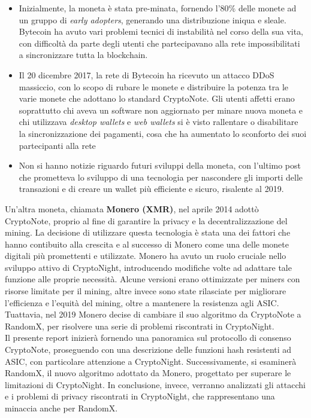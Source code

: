 \begin{itemize}
  \item Inizialmente, la moneta è stata pre-minata,
  fornendo l'80\% delle monete ad un gruppo di \emph{early adopters},
  generando una distribuzione iniqua e sleale. Bytecoin ha avuto vari
  problemi tecnici di instabilità nel corso della sua vita, con difficoltà
  da parte degli utenti che partecipavano alla rete impossibilitati a
  sincronizzare tutta la blockchain.

  \item Il 20 dicembre 2017, la rete di
  Bytecoin ha ricevuto un attacco DDoS massiccio, con lo scopo di rubare
  le monete e distribuire la potenza tra le varie monete che adottano lo
  standard CryptoNote. Gli utenti affetti erano soprattutto chi aveva un
  software non aggiornato per minare nuova moneta e chi utilizzava
  \emph{desktop wallets} e \emph{web wallets} si è visto rallentare o
  disabilitare la sincronizzazione dei pagamenti, cosa che ha aumentato lo
  sconforto dei suoi partecipanti alla rete

  \item  Non si hanno notizie
  riguardo futuri sviluppi della moneta, con l'ultimo post che prometteva
  lo sviluppo di una tecnologia per nascondere gli importi delle
  transazioni e di creare un wallet più efficiente e sicuro, risalente al
  2019.
\end{itemize}

Un'altra moneta, chiamata \textbf{Monero (XMR)}, nel aprile 2014 adottò
CryptoNote, proprio al fine di garantire la privacy e la decentralizzazione del
mining. La decisione di utilizzare questa tecnologia è stata una dei
fattori che hanno contibuito alla crescita e al
successo di Monero come una delle monete digitali più promettenti e
utilizzate. 
Monero ha avuto un ruolo cruciale nello sviluppo attivo di
CryptoNight, introducendo modifiche volte ad adattare tale funzione alle proprie necessità. 
Alcune versioni erano ottimizzate per miners con risorse limitate per il mining, altre invece sono
state rilasciate per migliorare l'efficienza e l'equità del mining,
oltre a mantenere la resistenza agli ASIC. Tuattavia, nel 2019
Monero decise di cambiare il suo algoritmo da CryptoNote a RandomX, per risolvere una serie
di problemi riscontrati in CryptoNight. \\

Il presente report inizierà fornendo una panoramica sul protocollo di consenso CryptoNote, 
proseguendo con una descrizione delle funzioni hash resistenti ad ASIC, con particolare attenzione a CryptoNight. 
Successivamente, si esaminerà RandomX, il nuovo algoritmo adottato da Monero, progettato per superare le limitazioni di CryptoNight.
In conclusione, invece, verranno analizzati gli attacchi e i problemi di privacy riscontrati in CryptoNight, 
che rappresentano una minaccia anche per RandomX.


